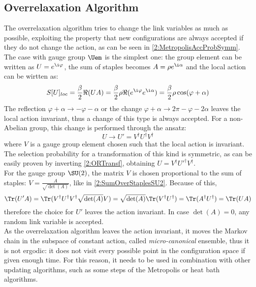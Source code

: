 \subsection{Overrelaxation Algorithm}
The overrelaxation algorithm tries to change the link variables as much as possible, exploiting the property that new configurations are always accepted if they do not change the action, as can be seen in \eqref{2:MetropolisAccProbSymm}.\\
The case with gauge group $\Uem$ is the simplest one: the group element can be written as $U=e^{\i\varphi}$, the sum of staples becomes $A=\rho e^{\i\alpha}$ and the local action can be wirtten as:
\begin{equation}
    S[U]_{loc} = \frac\beta2 \Re(UA) = \frac\beta2 \rho \Re(e^{\i\varphi}e^{\i\alpha}) = \frac\beta2\rho\cos(\varphi+\alpha) \label{2:SlocORU1}  
\end{equation}
The reflection $\varphi+\alpha\to-\varphi-\alpha$ or the change $\varphi+\alpha\to2\pi-\varphi-2\alpha$ leaves the local action invariant, thus a change of this type is always accepted.
For a non-Abelian group, this change is performed through the ansatz:
\begin{equation}
    U \to U' = V^\dagger U^\dagger V^\dagger \label{2:ORTransf}
\end{equation}
where $V$ is a gauge group element chosen such that the local action is invariant.
The selection probability for a transformation of this kind is symmetric, as can be easily proven by inverting \eqref{2:ORTransf}, obtaining $U = V^\dagger U'^\dagger V^\dagger$.\\
For the gauge group $\SU(2)$, the matrix $V$ is chosen proportional to the sum of staples: $V=\frac{A}{\sqrt{\det(A)}}$, like in \eqref{2:SumOverStaplesSU2}.
Because of this,
\begin{equation}
    \Tr(U'A) = \Tr(V^\dagger U^\dagger V^\dagger \sqrt{\det(A)} V) = \sqrt{\det(A)} \Tr(V^\dagger U^\dagger) = \Tr(A^\dagger U^\dagger) = \Tr(UA) \label{2:ORTrace}
\end{equation}
therefore the choice for $U'$ leaves the action invariant.
In case $\det(A)=0$, any random link variable is accepted.\\
As the overrelaxation algorithm leaves the action invariant, it moves the Markov chain in the subspace of constant action, called \emph{micro-canonical} ensemble, thus it is not ergodic: it does not visit every possible point in the configuration space if given enough time.
For this reason, it needs to be used in combination with other updating algorithms, such as some steps of the Metropolis or heat bath algorithms.

